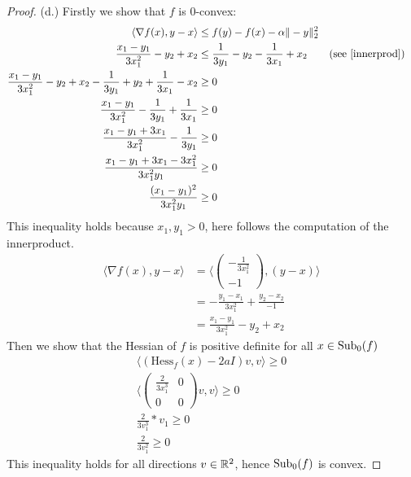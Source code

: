 \documentclass[british]{mscs-project}
\begin{document}
\begin{proof}
 (d.) Firstly we show that $f$ is $0$-convex:
 \begin{align*}
   \langle \nabla f(x), y - x \rangle &\leq f(y) - f(x) - \alpha  \Vert  - y \Vert^2_2 &\\
   \frac{x_1 - y_1}{3x_1^2} - y_2  + x_2  &\leq \frac{1}{3y_1} - y_2 - \frac{1}{3x_1} + x_2  &(\text{see \cref{innerprod}})&\\
   \frac{x_1 - y_1}{3x_1^2} - y_2  + x_2  - \frac{1}{3y_1} + y_2 + \frac{1}{3x_1} - x_2  &\geq 0 &\\
   \frac{x_1 - y_1}{3x_1^2}  - \frac{1}{3y_1} + \frac{1}{3x_1}   &\geq 0 &\\
   \frac{x_1 - y_1 + 3x_1}{3x_1^2}  - \frac{1}{3y_1}   &\geq 0 &\\
   \frac{x_1 - y_1 + 3x_1 - 3x_1^2}{3x_1^2y_1}   &\geq 0 &\\
   \frac{(x_1 - y_1)^2}{3x_1^2y_1}   &\geq 0&
 \end{align*}
 This inequality holds because $x_1,y_1 > 0$, here follows the computation of the innerproduct.
 \begin{align} \label{innerprod}
   \langle \nabla f(x), y - x \rangle &= \langle  \begin{pmatrix}
     -\frac{1}{3x_1^2} \\
     -1
   \end{pmatrix}, (y - x) \rangle \\
   &= -\frac{y_1 - x_1}{3x_1^2} +  \frac{y_2  - x_2}{-1} \\
   &= \frac{x_1 - y_1}{3x_1^2} - y_2  + x_2
 \end{align}
  Then we show that the Hessian of $f$ is positive definite for all $x \in \text{Sub}_0(f)$
 \begin{align*}
   \langle (\text{Hess}_f(x)-2aI)v, v\rangle \geq 0 \\
   \langle \begin{pmatrix}
     \frac{2}{3x_1^3} & 0 \\
     0 & 0
   \end{pmatrix} v, v\rangle \geq 0 \\
   \frac{2}{3v_1^3} * v_1 \geq 0 \\
   \frac{2}{3v_1^2} \geq 0
 \end{align*}
 This inequality holds for all directions $v \in \mathbb{R}^2$, hence $\text{Sub}_0(f)$ is convex.
\end{proof}
\end{document}

